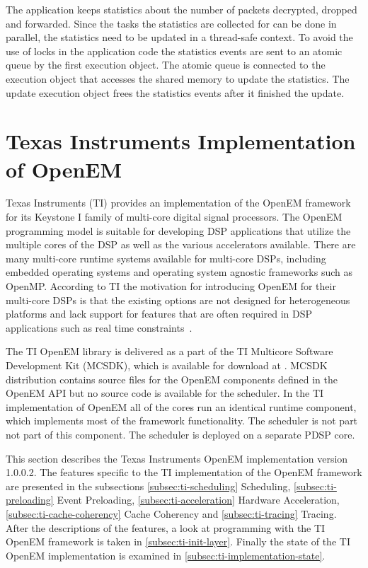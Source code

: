 The application keeps statistics about the number of packets decrypted, dropped and forwarded. Since the tasks the statistics are collected for can be done in parallel, the statistics need to be updated in a thread-safe context. To avoid the use of locks in the application code the statistics events are sent to an atomic queue by the first execution object. The atomic queue is connected to the execution object that accesses the shared memory to update the statistics. The update execution object frees the statistics events after it finished the update.

\section[Texas Instruments Implementation of OpenEM]{Texas Instruments Implementation\\of OpenEM}
\label{sec:tiopenem}
Texas Instruments (TI) provides an implementation of the OpenEM framework for its Keystone I family of multi-core digital signal processors. The OpenEM programming model is suitable for developing DSP applications that utilize the multiple cores of the DSP as well as the various accelerators available. There are many multi-core runtime systems available for multi-core DSPs, including embedded operating systems and operating system agnostic frameworks such as OpenMP. According to TI the motivation for introducing OpenEM for their multi-core DSPs is that the existing options are not designed for heterogeneous platforms and lack support for features that are often required in DSP applications such as real time constraints~\cite{moerman2014open}.

The TI OpenEM library is delivered as a part of the TI Multicore Software Development Kit (MCSDK), which is available for download at \cite{mcsdkdown}. MCSDK distribution contains source files for the OpenEM components defined in the OpenEM API but no source code is available for the scheduler. In the TI implementation of OpenEM all of the cores run an identical runtime component, which implements most of the framework functionality. The scheduler is not part not part of this component. The scheduler is deployed on a separate PDSP core.

This section describes the Texas Instruments OpenEM implementation version 1.0.0.2. The features specific to the TI implementation of the OpenEM framework are presented in the subsections \ref{subsec:ti-scheduling} Scheduling, \ref{subsec:ti-preloading} Event Preloading, \ref{subsec:ti-acceleration} Hardware Acceleration, \ref{subsec:ti-cache-coherency} Cache Coherency and \ref{subsec:ti-tracing} Tracing. After the descriptions of the features, a look at programming with the TI OpenEM framework is taken in \ref{subsec:ti-init-layer}. Finally the state of the TI OpenEM implementation is examined in \ref{subsec:ti-implementation-state}.

